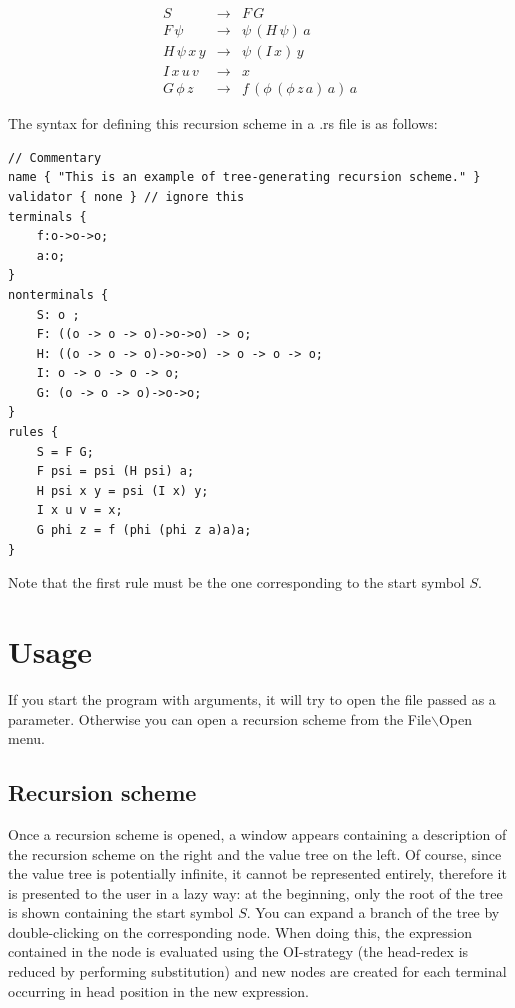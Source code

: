 \documentclass{article}
\begin{document}
\[\begin{array}{rll}
   S & \rightarrow & F\, G \\
    F\, \psi & \rightarrow &\psi\, (H\, \psi)\, a \\
    H\, \psi\, x\, y & \rightarrow & \psi\, (I\, x)\, y \\
    I\, x\, u\, v & \rightarrow & x \\
    G\, \phi\, z & \rightarrow &f\, (\phi\, (\phi\, z\, a)\,a)\,a
\end{array}\]

The syntax for defining this recursion scheme in a .rs file is as follows:

\begin{lstlisting}
// Commentary
name { "This is an example of tree-generating recursion scheme." }
validator { none } // ignore this
terminals {
    f:o->o->o;
    a:o;
}
nonterminals {
    S: o ;
    F: ((o -> o -> o)->o->o) -> o;
    H: ((o -> o -> o)->o->o) -> o -> o -> o;
    I: o -> o -> o -> o;
    G: (o -> o -> o)->o->o;
}
rules {
    S = F G;
    F psi = psi (H psi) a;
    H psi x y = psi (I x) y;
    I x u v = x;
    G phi z = f (phi (phi z a)a)a;
}
\end{lstlisting}

Note that the first rule must be the one corresponding to the start symbol $S$.

\section{Usage}

If you start the program with arguments, it will try to open the file passed as a parameter. Otherwise
you can open a recursion scheme from the File$\backslash$Open menu.

\subsection{Recursion scheme}

Once a recursion scheme is opened, a window appears containing a description of the recursion scheme on the right and the value tree on the left. Of course, since the value tree is potentially infinite, it cannot be represented entirely, therefore it is presented to the user in a lazy way: at the beginning, only the root of the tree is shown containing the start symbol $S$. You can expand a branch of the tree by double-clicking on the corresponding node. When doing this, the expression contained in the node is evaluated using the OI-strategy (the head-redex is reduced by performing substitution) and new nodes are created for each terminal occurring in head position in the new expression.
\end{document}
